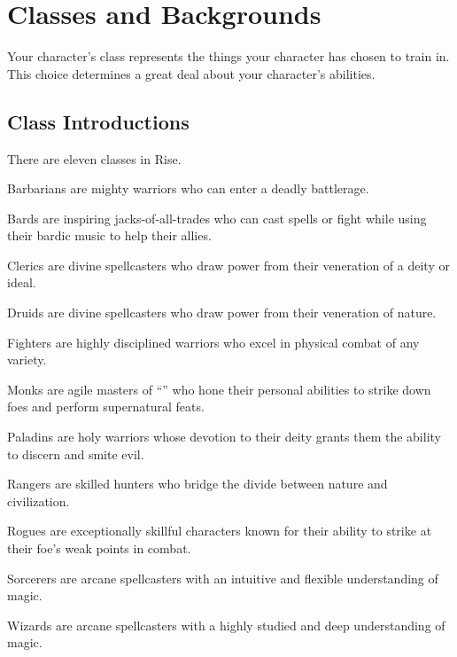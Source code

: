 \chapter{Classes and Backgrounds}
Your character's class represents the things your character has chosen to train in. This choice determines a great deal about your character's abilities.

\section{Class Introductions}
There are eleven classes in Rise.
\begin{itemize*}
  \item Barbarians are mighty warriors who can enter a deadly battlerage.
  \item Bards are inspiring jacks-of-all-trades who can cast spells or fight while using their bardic music to help their allies.
  \item Clerics are divine spellcasters who draw power from their veneration of a deity or ideal.
  \item Druids are divine spellcasters who draw power from their veneration of nature.
  \item Fighters are highly disciplined warriors who excel in physical combat of any variety.
  \item Monks are agile masters of ``\ki'' who hone their personal abilities to strike down foes and perform supernatural feats.
  \item Paladins are holy warriors whose devotion to their deity grants them the ability to discern and smite evil.
  \item Rangers are skilled hunters who bridge the divide between nature and civilization.
  \item Rogues are exceptionally skillful characters known for their ability to strike at their foe's weak points in combat.
  \item Sorcerers are arcane spellcasters with an intuitive and flexible understanding of magic.
  \item Wizards are arcane spellcasters with a highly studied and deep understanding of magic.
\end{itemize*}
